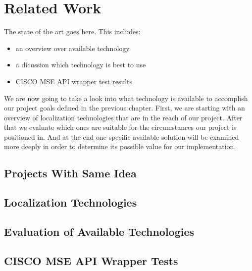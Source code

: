 \chapter{Related Work}
\label{cha:relatedwork}

The state of the art goes here. This includes:
\begin{itemize}
    \item an overview over available technology
    \item a dicussion which technology is best to use
    \item CISCO MSE API wrapper test results
\end{itemize}


\vspace{0.5cm}

We are now going to take a look into what technology is available to accomplish our project goals defined in the previous chapter. First, we are starting with an overview of localization technologies that are in the reach of our project. After that we evaluate which ones are suitable for the circumstances our project is positioned in. And at the end one specific available solution will be examined more deeply in order to determine its possible value for our implementation.


\vspace{0.5cm}

\section{Projects With Same Idea}


\vspace{0.5cm}

\section{Localization Technologies}


\vspace{0.5cm}

\section{Evaluation of Available Technologies}


\vspace{0.5cm}

\section{CISCO MSE API Wrapper Tests}

